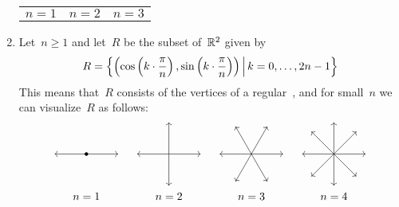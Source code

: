 \begin{examples}
\begin{enumerate}
\begin{center}
\begin{tabular}{ccc}
        \\
        $n = 1$
        &
        $n = 2$
        &
        $n = 3$
      \end{tabular}
      \endgroup
      \end{center}
    \item
      Let~$n \geq 1$ and let~$R$ be the subset of~$\mathbb{R}^2$ given by
      \[
        R
        =
        \left\{
          \left(
            \cos\left( k \cdot \frac{\pi}{n} \right),
            \sin\left( k \cdot \frac{\pi}{n} \right) 
          \right)
        \suchthat*
          k = 0, \dotsc, 2n-1
        \right\}
      \]
      This means that~$R$ consists of the vertices of a regular~{}, and for small~$n$ we can visualize~$R$ as follows:
      \[
        \begingroup
        \renewcommand{\arraystretch}{1.5}
        \begin{array}{cccc}
          \vcenter{
          \hbox{
          \begin{tikzpicture}
            \draw[->] (0,0) -- (1,0);
            \draw[->] (0,0) -- (-1,0);
            \draw[fill] (0,0) circle (0.05);
          \end{tikzpicture}
          }
          }
          &
          \vcenter{
          \hbox{
          \begin{tikzpicture}
            \foreach \ang in {90, 180, 270, 360}{
              \draw[->] (0,0) -- (\ang:1);
            }
          \end{tikzpicture}
          }
          }
          &
          \vcenter{
          \hbox{
          \begin{tikzpicture}
            \foreach \ang in {60, 120, ..., 360}{
              \draw[->] (0,0) -- (\ang:1);
            }
          \end{tikzpicture}
          }
          }
          &
          \vcenter{
          \hbox{
          \begin{tikzpicture}
            \foreach \ang in {45, 90, ..., 360}{
              \draw[->] (0,0) -- (\ang:1);
            }
          \end{tikzpicture}
          }
          }
          \\
          n = 1
          &
          n = 2
          &
          n = 3
          &
          n = 4
        \end{array}
        \endgroup
      \]

\end{enumerate}
\end{examples}
